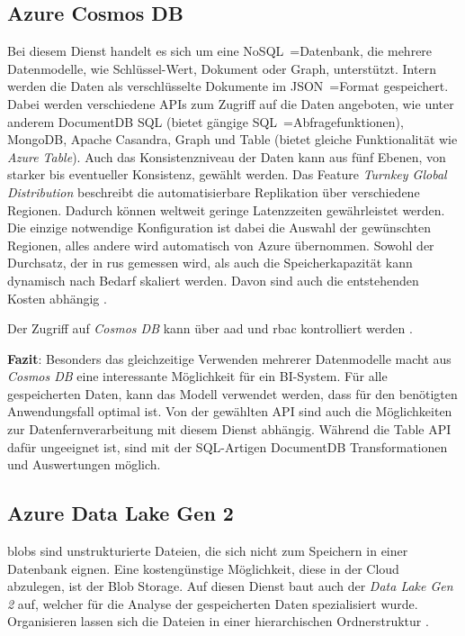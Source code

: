\subsection{Azure Cosmos DB} \label{sec:grundlagen:azure_dienste:cosmosDB}
Bei diesem Dienst handelt es sich um eine NoSQL~=Datenbank, die mehrere Datenmodelle, wie Schlüssel-Wert, Dokument oder Graph, unterstützt. Intern werden die Daten als verschlüsselte Dokumente im JSON~=Format gespeichert. Dabei werden verschiedene APIs zum Zugriff auf die Daten angeboten, wie unter anderem DocumentDB SQL (bietet gängige SQL~=Abfragefunktionen), MongoDB, Apache Casandra, Graph und Table (bietet gleiche Funktionalität wie \textit{Azure Table}). Auch das Konsistenzniveau der Daten kann aus fünf Ebenen, von starker bis eventueller Konsistenz, gewählt werden. Das Feature \textit{Turnkey Global Distribution} beschreibt die automatisierbare Replikation über verschiedene Regionen. Dadurch können weltweit geringe Latenzzeiten gewährleistet werden. Die einzige notwendige Konfiguration ist dabei die Auswahl der gewünschten Regionen, alles andere wird automatisch von Azure übernommen. Sowohl der Durchsatz, der in \acp{ru} gemessen wird, als auch die Speicherkapazität kann dynamisch nach Bedarf skaliert werden. Davon sind auch die entstehenden Kosten abhängig \cite{guay_paz_microsoft_2018}\cite{mrzyglod_hands-azure_2018}.

Der Zugriff auf \textit{Cosmos DB} kann über \ac{aad} und \ac{rbac} kontrolliert werden \cite{msdoc_21_cosmos_rbac}.

\textbf{Fazit}: Besonders das gleichzeitige Verwenden mehrerer Datenmodelle macht aus \textit{Cosmos DB} eine interessante Möglichkeit für ein BI-System. Für alle gespeicherten Daten, kann das Modell verwendet werden, dass für den benötigten Anwendungsfall optimal ist. Von der gewählten API sind auch die Möglichkeiten zur Datenfernverarbeitung mit diesem Dienst abhängig. Während die Table API dafür ungeeignet ist, sind mit der SQL-Artigen DocumentDB Transformationen und Auswertungen möglich.


\subsection{Azure Data Lake Gen 2} \label{sec:grundlagen:azure_dienste:dataLake}
\acp{blob} sind unstrukturierte Dateien, die sich nicht zum Speichern in einer Datenbank eignen. Eine kostengünstige Möglichkeit, diese in der Cloud abzulegen, ist der Blob Storage. Auf diesen Dienst baut auch der \textit{Data Lake Gen 2} auf, welcher für die Analyse der gespeicherten Daten spezialisiert wurde. Organisieren lassen sich die Dateien in einer hierarchischen Ordnerstruktur \cite{soh_microsoft_2020}.

